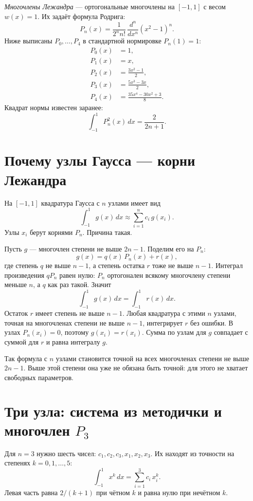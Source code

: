 \documentclass[11pt,a4paper]{article}
\begin{document}
\emph{Многочлены Лежандра} --- ортогональные многочлены на \([-1, 1]\) с весом \(w(x) = 1\).
Их задаёт формула Родрига:
\[
P_{n}(x) = \frac{1}{2^{n} n!}\, \frac{d^{n}}{dx^{n}} (x^{2} - 1)^{n}.
\]
Ниже выписаны \(P_{0}, \ldots, P_{4}\) в стандартной нормировке \(P_{n}(1) = 1\):
\[
\begin{aligned}
P_{0}(x) &= 1,\\
P_{1}(x) &= x,\\
P_{2}(x) &= \frac{3x^{2} - 1}{2},\\
P_{3}(x) &= \frac{5x^{3} - 3x}{2},\\
P_{4}(x) &= \frac{35x^{4} - 30x^{2} + 3}{8}.
\end{aligned}
\]
Квадрат нормы известен заранее:
\[
\int_{-1}^{1} P_{n}^{2}(x)\, dx = \frac{2}{2n + 1}.
\]

\section*{Почему узлы Гаусса --- корни Лежандра}

На \([-1, 1]\) квадратура Гаусса с \(n\) узлами имеет вид
\[
\int_{-1}^{1} g(x)\, dx \approx \sum_{i=1}^{n} c_{i}\, g(x_{i}).
\]
Узлы \(x_{i}\) берут корнями \(P_{n}\). Причина такая.

Пусть \(g\) --- многочлен степени не выше \(2n - 1\).
Поделим его на \(P_{n}\):
\[
g(x) = q(x)\, P_{n}(x) + r(x),
\]
где степень \(q\) не выше \(n - 1\), а степень остатка \(r\) тоже не выше \(n - 1\).
Интеграл произведения \(q P_{n}\) равен нулю: \(P_{n}\) ортогонален всякому многочлену
степени меньше \(n\), а \(q\) как раз такой. Значит
\[
\int_{-1}^{1} g(x)\, dx = \int_{-1}^{1} r(x)\, dx.
\]
Остаток \(r\) имеет степень не выше \(n - 1\). Любая квадратура с этими \(n\) узлами,
точная на многочленах степени не выше \(n - 1\), интегрирует \(r\) без ошибки.
В узлах \(P_{n}(x_{i}) = 0\), поэтому \(g(x_{i}) = r(x_{i})\).
Сумма по узлам для \(g\) совпадает с суммой для \(r\) и равна интегралу \(g\).

Так формула с \(n\) узлами становится точной на всех многочленах степени не выше \(2n - 1\).
Выше этой степени она уже не обязана быть точной: для этого не хватает свободных параметров.

\section*{Три узла: система из методички и многочлен \(P_{3}\)}

Для \(n = 3\) нужно шесть чисел: \(c_{1}, c_{2}, c_{3}, x_{1}, x_{2}, x_{3}\).
Их находят из точности на степенях \(k = 0, 1, \ldots, 5\):
\[
\int_{-1}^{1} x^{k}\, dx = \sum_{i=1}^{3} c_{i}\, x_{i}^{k}.
\]
Левая часть равна \(2/(k+1)\) при чётном \(k\) и равна нулю при нечётном \(k\).
\end{document}
